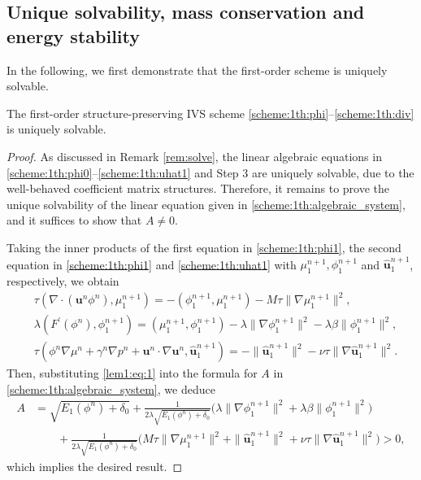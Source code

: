 \subsection{Unique solvability, mass conservation and energy stability}
In the following, we first demonstrate that the first-order scheme is uniquely solvable.
\begin{theorem}  \label{thm:solvable}
	The first-order structure-preserving IVS scheme \eqref{scheme:1th:phi}--\eqref{scheme:1th:div} is uniquely solvable.
\end{theorem}
\begin{proof}
	As discussed in Remark \ref{rem:solve}, the linear algebraic equations in \eqref{scheme:1th:phi0}--\eqref{scheme:1th:uhat1} and Step 3 are uniquely solvable, due to the well-behaved coefficient matrix structures. Therefore, it remains to prove the unique solvability of the linear equation given in \eqref{scheme:1th:algebraic_system}, and it suffices to show that $A \neq 0$.
	
	Taking the inner products of the first equation in \eqref{scheme:1th:phi1}, the second equation in \eqref{scheme:1th:phi1} and \eqref{scheme:1th:uhat1}  with $\mu_1^{n+1}, \phi_1^{n+1}$ and $\widehat{\bm u}_1^{n+1}$, respectively, we obtain
	\begin{equation} \label{lem1:eq:1}
		\begin{aligned}
			& \tau(\nabla \cdot(\bm u^n  \phi^n ), \mu_1^{n+1})=-(\phi_1^{n+1}, \mu_1^{n+1})-M \tau\|\nabla \mu_1^{n+1}\|^2, \\
			& \lambda(F^{\prime}(\phi^n), \phi_1^{n+1})=(\mu_1^{n+1}, \phi_1^{n+1})-\lambda\|\nabla \phi_1^{n+1}\|^2- \lambda \beta\|\phi_1^{n+1}\|^2, \\
			& \tau ( \phi^n \nabla \mu^n +\gamma^n\nabla p^n + \bm u^n \cdot \nabla \bm u^n, \widehat{\bm u}_1^{n+1})=-\|\widehat{\bm u}_1^{n+1}\|^2-\nu \tau\|\nabla \widehat{\bm u}_1^{n+1}\|^2.
		\end{aligned}
	\end{equation} 
	Then, substituting \eqref{lem1:eq:1} into the formula for $A$ in \eqref{scheme:1th:algebraic_system}, we deduce
	\begin{equation*}
		\begin{aligned}
			A& = \sqrt{E_1(\phi^n)+\delta_0}+\frac{1}{2\lambda \sqrt{E_1(\phi^n)+\delta_0}}\big(\lambda\|\nabla \phi_1^{n+1}\|^2+\lambda \beta\|\phi_1^{n+1}\|^2\big) \\
			& \qquad +\frac{1}{2  \lambda \sqrt{E_1(\phi^n)+\delta_0}}\big(M\tau\|\nabla \mu_1^{n+1}\|^2+\|\widehat{\bm u}_1^{n+1}\|^2+\nu\tau\|\nabla \widehat{\bm u}_1^{n+1}\|^2\big) >0,
		\end{aligned}
	\end{equation*}
	which implies the desired result.
\end{proof}

